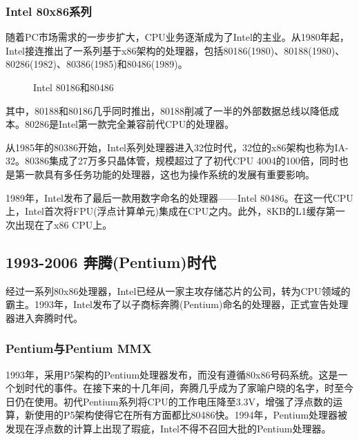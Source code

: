 \documentclass[UTF8]{ctexart}
\begin{document}
\subsubsection{Intel 80x86系列}
随着PC市场需求的一步步扩大，CPU业务逐渐成为了Intel的主业。从1980年起，Intel接连推出了一系列基于x86架构的处理器，包括80186(1980)、80188(1980)、80286(1982)、80386(1985)和80486(1989)。
\begin{figure}[H]
    \centering
    \caption{Intel 80186和80486}
\end{figure}
其中，80188和80186几乎同时推出，80188削减了一半的外部数据总线以降低成本。80286是Intel第一款完全兼容前代CPU的处理器。

从1985年的80386开始，Intel系列处理器进入32位时代，32位的x86架构也称为IA-32。80386集成了27万多只晶体管，规模超过了了初代CPU 4004的100倍，同时也是第一款具有多任务功能的处理器，这也为操作系统的发展有重要影响。

1989年，Intel发布了最后一款用数字命名的处理器——Intel 80486。在这一代CPU上，Intel首次将FPU(浮点计算单元)集成在CPU之内。此外，8KB的L1缓存第一次出现在了x86 CPU上。


\subsection{1993-2006 奔腾(Pentium)时代}
经过一系列80x86处理器，Intel已经从一家主攻存储芯片的公司，转为CPU领域的霸主。1993年，Intel发布了以子商标奔腾(Pentium)命名的处理器，正式宣告处理器进入奔腾时代。
\subsubsection{Pentium与Pentium MMX}
1993年，采用P5架构的Pentium处理器发布，而没有遵循80x86号码系统。这是一个划时代的事件。在接下来的十几年间，奔腾几乎成为了家喻户晓的名字，时至今日仍在使用。初代Pentium系列将CPU的工作电压降至3.3V，增强了浮点数的运算，新使用的P5架构使得它在所有方面都比80486快。1994年，Pentium处理器被发现在浮点数的计算上出现了瑕疵，Intel不得不召回大批的Pentium处理器。
\end{document}
